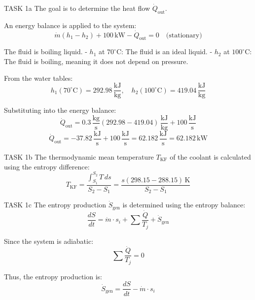 TASK 1a  
The goal is to determine the heat flow \( \dot{Q}_{\text{out}} \).  

An energy balance is applied to the system:  
\[
\dot{m} (h_1 - h_2) + 100 \, \text{kW} - \dot{Q}_{\text{out}} = 0 \quad \text{(stationary)}
\]  

The fluid is boiling liquid.  
- \( h_1 \) at \( 70^\circ\text{C} \): The fluid is an ideal liquid.  
- \( h_2 \) at \( 100^\circ\text{C} \): The fluid is boiling, meaning it does not depend on pressure.  

From the water tables:  
\[
h_1(70^\circ\text{C}) = 292.98 \, \frac{\text{kJ}}{\text{kg}}, \quad h_2(100^\circ\text{C}) = 419.04 \, \frac{\text{kJ}}{\text{kg}}
\]  

Substituting into the energy balance:  
\[
\dot{Q}_{\text{out}} = 0.3 \, \frac{\text{kg}}{\text{s}} \left(292.98 - 419.04\right) \, \frac{\text{kJ}}{\text{kg}} + 100 \, \frac{\text{kJ}}{\text{s}}
\]  
\[
\dot{Q}_{\text{out}} = -37.82 \, \frac{\text{kJ}}{\text{s}} + 100 \, \frac{\text{kJ}}{\text{s}} = 62.182 \, \frac{\text{kJ}}{\text{s}} = 62.182 \, \text{kW}
\]  

TASK 1b  
The thermodynamic mean temperature \( T_{\text{KF}} \) of the coolant is calculated using the entropy difference:  
\[
T_{\text{KF}} = \frac{\int_{S_1}^{S_2} T \, ds}{S_2 - S_1} = \frac{s(298.15 - 288.15) \, \text{K}}{S_2 - S_1}
\]  

TASK 1c  
The entropy production \( \dot{S}_{\text{gen}} \) is determined using the entropy balance:  
\[
\frac{dS}{dt} = \dot{m} \cdot s_i + \sum \frac{\dot{Q}}{T_j} + \dot{S}_{\text{gen}}
\]  

Since the system is adiabatic:  
\[
\sum \frac{\dot{Q}}{T_j} = 0
\]  

Thus, the entropy production is:  
\[
\dot{S}_{\text{gen}} = \frac{dS}{dt} - \dot{m} \cdot s_i
\]